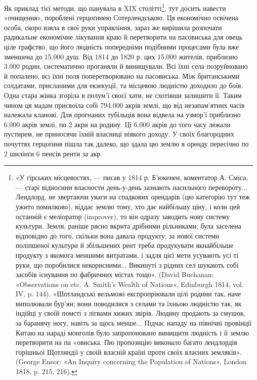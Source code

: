 Як приклад тієї методи, що панувала в XIX столітті\footnote{
«У гірських місцевостях, — писав у 1814 р. Б’юкенен, коментатор
А. Сміса, — старі відносини власности день-у-день зазнають насильного
перевороту... Лендлорд, не звертаючи уваги на спадкових орендарів
(цю категорію тут теж ужито помилково), віддає землю тому, хто дає найбільшу
ціну, і коли цей останній є меліоратор (improver), то він одразу заводить
нову систему культури. Земля, раніше рясно вкрита дрібними рільниками,
була заселена відповідно до того, скільки вона давала продукту;
за нової системи поліпшеної культури й збільшених рент треба продукувати
якнайбільше продукту з якомога меншими витратами, і задля цієї
мети усувають усі ті руки, що поробилися некорисними... Викинуті з
рідних сел шукають собі засобів існування по фабричних містах тощо».
(David Buchanan: «Observations on etc. A. Smith’s Wealth of Nations»,
Edinburgh 1814, vol. IV, p. 144). «Шотландські вельможі експропріювали
цілі родини так, наче виполювали бур’ян; вони поводилися з селами
та їхньою людністю так, як індійці у своїй помсті з лігвами хижих звірів.
Людину продають за смушок, за баранячу ногу, навіть за щось
менше... Підчас нападу на північні провінції Китаю на нараді монголів
було запропоновано винищити людність і її землю перетворити на па «овиська.
Пю пропозицію виконало багато лендлордів горішньої Щотляндії
у своїй власній країні проти своїх власних земляків». (George
Ensor: «An Inquiry concerning the Population of Nations», London 1818,
p. 215, 216).
}, тут досить
навести «очищення», пороблені герцоґинею Сотерлендською.
Ця економічно освічена особа, скоро взяла в свої руки управління,
зараз же вирішила розпочати радикальне економічне лікування
краю й перетворити на пасовиська для овець ціле графство,
що його людність попередніми подібними процесами була
вже зменшена до 15.000 душ. Від 1814 до 1820 р. цих 15.000 жителів,
приблизно 3.000 родин, систематично проганяли й винищували.
Всі їхні села позруйновано й попалено, всі їхні поля
поперетворювано на пасовиська. Між британськими солдатами,
присланими для екзекуції, та місцевою людністю доходило до
боїв. Одна стара жінка згоріла в полум’ї своєї хати, не схотівши
залишити її. Таким чином ця мадам присвоїла собі 794.000 акрів
землі, що від незапам’ятних часів належала кланові. Для прогнаних
тубільців вона відвела на узмор’ї приблизно 6.000 акрів
землі, по 2 акри на родину. Ці 6.000 акрів до того часу лежали
пустирем, не приносячи їхній власниці ніякого доходу. У своїх
благородних почуттях герцоґиня пішла так далеко, що здала
цю землю в оренду пересічно по 2 шилінґи 6 пенсів ренти за акр
